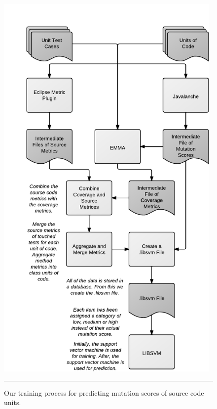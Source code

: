 \begin{figure}[H]
  \centering
  \includegraphics[width=11cm]{figures/process.pdf}
  \caption{Our training process for predicting mutation scores of source code units.}
  \label{fig:process}
  \vspace{2mm}
  \hrule
\end{figure}


